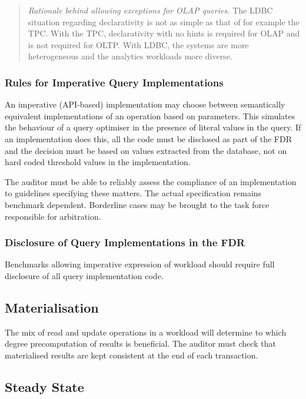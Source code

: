 \begin{quote}
    \emph{Rationale behind allowing exceptions for OLAP queries.}
    The LDBC situation regarding declarativity is not as simple as that of for example the TPC. With the TPC, declarativity with no hints is required for OLAP and is not required for OLTP. With LDBC, the systems are more heterogeneous and the analytics workloads more diverse.
\end{quote}

\subsubsection{Rules for Imperative Query Implementations}
An imperative (\eg API-based) implementation may choose between semantically equivalent implementations of an operation based on parameters. This simulates the behaviour of a query optimiser in the presence of literal values in the query. If an implementation does this, all the code must be disclosed as part of the FDR and the decision must be based on values extracted from the database, not on hard coded threshold values in the implementation.

The auditor must be able to reliably assess the compliance of an implementation to guidelines specifying these matters. The actual specification remains benchmark dependent. Borderline cases may be brought to the task force responsible for arbitration.


\subsubsection{Disclosure of Query Implementations in the FDR}
Benchmarks allowing imperative expression of workload should require full disclosure of all query implementation code.

\subsection{Materialisation}

The mix of read and update operations in a workload will determine to which degree precomputation of results is beneficial. The auditor must check that materialised results are kept consistent at the end of each transaction.

\subsection{Steady State}


